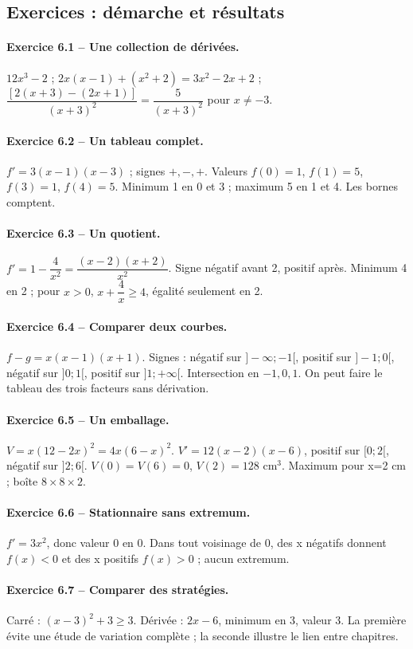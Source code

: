\subsection*{Exercices : démarche et résultats}
\paragraph{Exercice 6.1 -- Une collection de dérivées.} $12x^3-2$ ; $2x(x-1)+(x^2+2)=3x^2-2x+2$ ; $\dfrac{[2(x+3)-(2x+1)]}{(x+3)^2}=\dfrac{5}{(x+3)^2}$ pour $x\ne-3$.
\paragraph{Exercice 6.2 -- Un tableau complet.} $f\prime=3(x-1)(x-3)$ ; signes $+,-,+$. Valeurs $f(0)=1$, $f(1)=5$, $f(3)=1$, $f(4)=5$. Minimum 1 en 0 et 3 ; maximum 5 en 1 et 4. Les bornes comptent.
\paragraph{Exercice 6.3 -- Un quotient.} $f\prime =1-\dfrac{4}{x^2}=\dfrac{(x-2)(x+2)}{x^2}$. Signe négatif avant 2, positif après. Minimum 4 en 2 ; pour $x>0$, $x+\dfrac{4}{x}\geq 4$, égalité seulement en 2.
\paragraph{Exercice 6.4 -- Comparer deux courbes.} $f-g=x(x-1)(x+1)$. Signes : négatif sur $]-\infty;-1[$, positif sur $]-1;0[$, négatif sur $]0;1[$, positif sur $]1;+\infty[$. Intersection en $-1,0,1$. On peut faire le tableau des trois facteurs sans dérivation.
\paragraph{Exercice 6.5 -- Un emballage.} $V=x(12-2x)^2=4x(6-x)^2$. $V\prime=12(x-2)(x-6)$, positif sur $[0;2[$, négatif sur $]2;6[$. $V(0)=V(6)=0$, $V(2)=128$ cm$^3$. Maximum pour x=2 cm ; boîte $8\times8\times2$.
\paragraph{Exercice 6.6 -- Stationnaire sans extremum.} $f\prime=3x^2$, donc valeur 0 en 0. Dans tout voisinage de 0, des x négatifs donnent $f(x)<0$ et des x positifs $f(x)>0$ ; aucun extremum.
\paragraph{Exercice 6.7 -- Comparer des stratégies.} Carré : $(x-3)^2+3\geq3$. Dérivée : $2x-6$, minimum en 3, valeur 3. La première évite une étude de variation complète ; la seconde illustre le lien entre chapitres.

